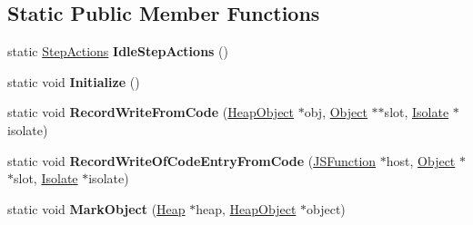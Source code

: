\subsection*{Static Public Member Functions}
\begin{DoxyCompactItemize}
\item 
static \hyperlink{structv8_1_1internal_1_1_incremental_marking_1_1_step_actions}{Step\+Actions} {\bfseries Idle\+Step\+Actions} ()\hypertarget{classv8_1_1internal_1_1_incremental_marking_ac3aa0d2a4a7e8f32a8c78ef65aef4b09}{}\label{classv8_1_1internal_1_1_incremental_marking_ac3aa0d2a4a7e8f32a8c78ef65aef4b09}

\item 
static void {\bfseries Initialize} ()\hypertarget{classv8_1_1internal_1_1_incremental_marking_a9760127cadb1b9e119de30e4a9878add}{}\label{classv8_1_1internal_1_1_incremental_marking_a9760127cadb1b9e119de30e4a9878add}

\item 
static void {\bfseries Record\+Write\+From\+Code} (\hyperlink{classv8_1_1internal_1_1_heap_object}{Heap\+Object} $\ast$obj, \hyperlink{classv8_1_1internal_1_1_object}{Object} $\ast$$\ast$slot, \hyperlink{classv8_1_1internal_1_1_isolate}{Isolate} $\ast$isolate)\hypertarget{classv8_1_1internal_1_1_incremental_marking_a39fbdf358a467898cbed23ee84d113e8}{}\label{classv8_1_1internal_1_1_incremental_marking_a39fbdf358a467898cbed23ee84d113e8}

\item 
static void {\bfseries Record\+Write\+Of\+Code\+Entry\+From\+Code} (\hyperlink{classv8_1_1internal_1_1_j_s_function}{J\+S\+Function} $\ast$host, \hyperlink{classv8_1_1internal_1_1_object}{Object} $\ast$$\ast$slot, \hyperlink{classv8_1_1internal_1_1_isolate}{Isolate} $\ast$isolate)\hypertarget{classv8_1_1internal_1_1_incremental_marking_a24b4bc119c822663eff3c19333740f80}{}\label{classv8_1_1internal_1_1_incremental_marking_a24b4bc119c822663eff3c19333740f80}

\item 
static void {\bfseries Mark\+Object} (\hyperlink{classv8_1_1internal_1_1_heap}{Heap} $\ast$heap, \hyperlink{classv8_1_1internal_1_1_heap_object}{Heap\+Object} $\ast$object)\hypertarget{classv8_1_1internal_1_1_incremental_marking_ae5a71b052e8d568b16bedc72e41e73ac}{}\label{classv8_1_1internal_1_1_incremental_marking_ae5a71b052e8d568b16bedc72e41e73ac}

\end{DoxyCompactItemize}
